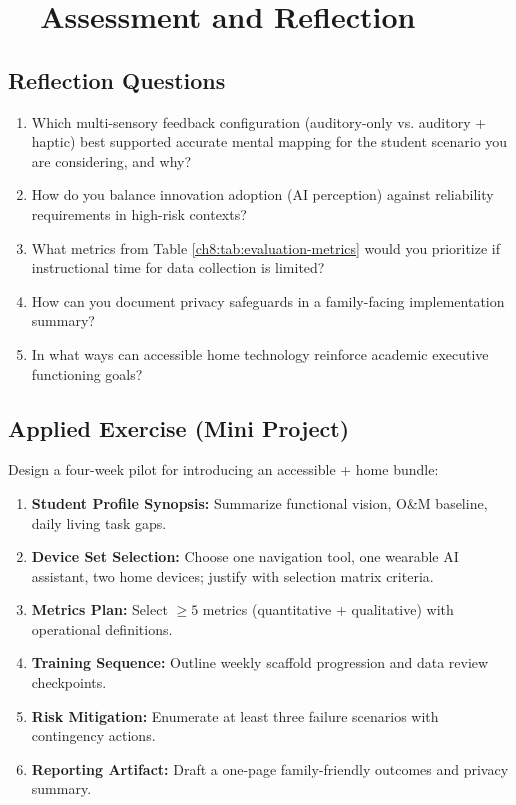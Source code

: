 \section{~~Assessment and Reflection}\label{ch8:sec:assessment-reflection}

\subsection*{Reflection Questions}
\begin{enumerate}
	\item Which multi-sensory feedback configuration (auditory-only vs. auditory + haptic) best supported accurate mental mapping for the student scenario you are considering, and why?
	\item How do you balance innovation adoption (AI perception) against reliability requirements in high-risk  contexts?
	\item What metrics from Table \ref{ch8:tab:evaluation-metrics} would you prioritize if instructional time for data collection is limited?
	\item How can you document privacy safeguards in a family-facing implementation summary?
	\item In what ways can accessible home technology reinforce academic executive functioning goals?
\end{enumerate}

\subsection*{Applied Exercise (Mini Project)}
Design a four-week pilot for introducing an accessible  + home  bundle:
\begin{enumerate}
	\item \textbf{Student Profile Synopsis:} Summarize functional vision, O\&M baseline, daily living task gaps.
	\item \textbf{Device Set Selection:} Choose one navigation tool, one wearable AI assistant, two home devices; justify with selection matrix criteria.
	\item \textbf{Metrics Plan:} Select $\geq 5$ metrics (quantitative + qualitative) with operational definitions.
	\item \textbf{Training Sequence:} Outline weekly scaffold progression and data review checkpoints.
	\item \textbf{Risk Mitigation:} Enumerate at least three failure scenarios with contingency actions.
	\item \textbf{Reporting Artifact:} Draft a one-page family-friendly outcomes and privacy summary.
\end{enumerate}

